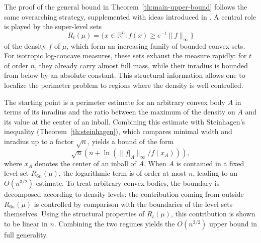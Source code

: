 \documentclass[11pt,leqno]{article}
\theoremstyle{remark}
\numberwithin{equation}{section}
\newcommand{\gr}{\geqslant}
\begin{document}
The proof of the general bound in Theorem~\ref{th:main-upper-bound} follows the same overarching strategy, supplemented with ideas introduced in \cite{Livshyts-2021}. 
A central role is played by the super-level sets 
$$R_t(\mu)=\{x\in\mathbb{R}^n: f(x)\gr e^{-t}\|f\|_{\infty}\}$$ 
of the density $f$ of $\mu$, which form an increasing family of bounded convex sets. 
For isotropic log-concave measures, these sets exhaust the measure rapidly: for $t$ of order $n$, they already carry almost full mass, 
while their inradius is bounded from below by an absolute constant. 
This structural information allows one to localize the perimeter problem to regions where the density is well controlled.

The starting point is a perimeter estimate for an arbitrary convex body $A$ in terms of its inradius and the ratio between the maximum of the density 
on $A$ and its value at the center of an inball. 
Combining this estimate with Steinhagen's inequality (Theorem~\ref{th:steinhagen}), which compares minimal width and inradius up to a factor $\sqrt{n}$, 
yields a bound of the form $$\sqrt{n}\left(n+\ln\left(\|f\big|_A\|_{\infty}/f(x_A)\right)\right),$$ where $x_A$ denotes the center of an inball of $A$.
When $A$ is contained in a fixed level set $R_{6n}(\mu)$, the logarithmic term is of order at most $n$, leading to an $O(n^{3/2})$ estimate.
To treat arbitrary convex bodies, the boundary is decomposed according to density levels: the contribution coming from outside $R_{6n}(\mu)$ 
is controlled by comparison with the boundaries of the level sets themselves.
Using the structural properties of $R_t(\mu)$, this contribution is shown to be linear in $n$.
Combining the two regimes yields the $O(n^{3/2})$ upper bound in full generality.



\medskip 
\end{document}

